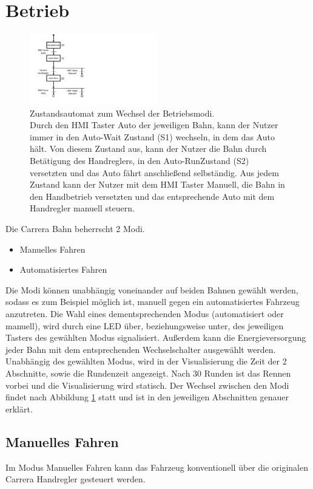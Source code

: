 \documentclass[a4paper, 11pt]{report}
\begin{document}
\section{Betrieb}
	\begin{figure}[ht]
		\centering
		\includegraphics[width=0.5\textwidth]{rec/modiAuswahl.pdf}
		\caption[Zustandsautomat zum Wechsel der Betriebsmodi]{Zustandsautomat zum Wechsel der Betriebsmodi.\\Durch den \glqq HMI Taster Auto\grqq{} der jeweiligen Bahn, kann der Nutzer immer in den \glqq Auto-Wait\grqq{} Zustand (S1) wechseln, in dem das Auto hält. Von diesem Zustand aus, kann der Nutzer die Bahn durch Betätigung des Handreglers, in den \glqq Auto-Run\grqq Zustand{} (S2) versetzten und das Auto fährt anschließend selbständig. Aus jedem Zustand kann der Nutzer mit dem \glqq HMI Taster Manuell\grqq{}, die Bahn in den Handbetrieb versetzten und das entsprechende Auto mit dem Handregler manuell steuern.}
		\label{img:Betriebsmodi}
	\end{figure}
	Die Carrera Bahn beherrscht 2 Modi.
	\begin{itemize}
		\item Manuelles Fahren
		\item Automatisiertes Fahren
	\end{itemize}
	Die Modi können unabhängig voneinander auf beiden Bahnen gewählt werden, sodass es zum Beispiel möglich ist, manuell gegen ein automatisiertes Fahrzeug anzutreten. Die Wahl eines dementsprechenden Modus (automatisiert oder manuell), wird durch eine LED über, beziehungsweise unter, des jeweiligen Tasters des gewählten Modus signalisiert. Außerdem kann die Energieversorgung jeder Bahn mit dem entsprechenden Wechselschalter ausgewählt werden. Unabhängig des gewählten Modus, wird in der Visualisierung die Zeit der 2 Abschnitte, sowie die Rundenzeit angezeigt. Nach 30 Runden ist das Rennen vorbei und die Visualisierung wird statisch.
	Der Wechsel zwischen den Modi findet nach Abbildung \ref{img:Betriebsmodi} statt und ist in den jeweiligen Abschnitten genauer erklärt.
	\subsection{Manuelles Fahren}\label{subsec:ManuellesFahren}
		Im Modus Manuelles Fahren kann das Fahrzeug konventionell über die originalen Carrera Handregler gesteuert
		werden.
\newpage
\end{document}
